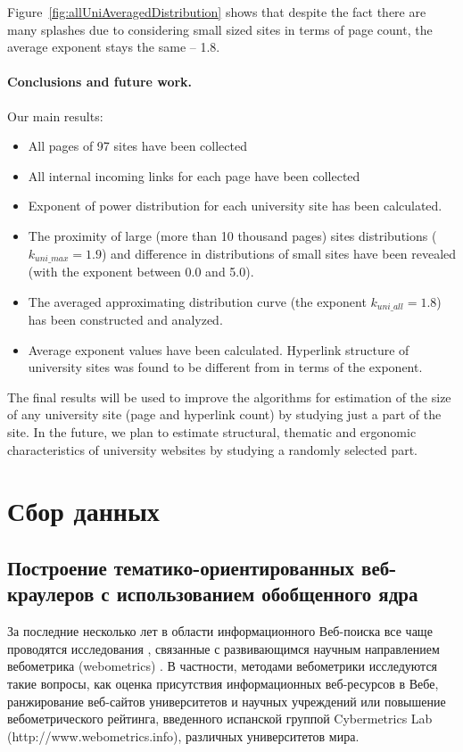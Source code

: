 Figure~\cref{fig:allUniAveragedDistribution} shows that despite the fact there are many splashes due to considering small sized sites in terms of page count, the average exponent stays the same -- 1.8.

\paragraph{Conclusions and future work.} Our main results: 

\begin{itemize}
	\item All pages of 97 sites have been collected
	\item All internal incoming links for each page have been
	collected
	\item Exponent of power distribution for each university site
	has been calculated.
	\item The proximity of large (more than 10 thousand pages)
	sites distributions (\(k_\textit{uni\_max} = 1.9\)) and difference in
	distributions of small sites have been revealed (with
	the exponent between 0.0 and 5.0).
	\item The averaged approximating distribution curve (the
	exponent \(k_\textit{uni\_all} = 1.8\)) has been constructed and
	analyzed.
	\item Average exponent values have been calculated.
	Hyperlink structure of university sites was found to be
	different from \cite{BarabasiAlbert,BroderKumarMaghoul} in terms of the exponent.
\end{itemize}

The final results will be used to improve the algorithms for estimation of the size of any university site (page and hyperlink count) by studying just a part of the site. In the future, we plan to estimate structural, thematic and ergonomic characteristics of university websites by studying a randomly selected part. 

\section{Сбор данных}\label{sec:ch1/sec3}

\subsection{Построение тематико-ориентированных веб-краулеров с использованием обобщенного ядра}\label{subsec:ch1/sec3/sub1}

За последние несколько лет в области информационного Веб-поиска все чаще проводятся исследования \cite{Pechnikov,PechnikovLugovayaChuiko,PechnikovChirkovChuiko}, связанные с развивающимся научным направлением вебометрика (webometrics) \cite{PechnikovLugovayaChuiko}. В частности, методами вебометрики исследуются такие вопросы, как оценка присутствия информационных веб-ресурсов в Вебе, ранжирование веб-сайтов университетов и научных учреждений \cite{Pechnikov,PechnikovChirkovChuiko} или повышение вебометрического рейтинга, введенного испанской группой Cybermetrics Lab (http://www.webometrics.info), различных университетов мира.

